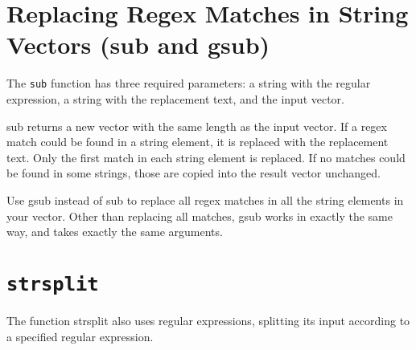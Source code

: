 \documentclass{article}
\begin{document}
\section{Replacing Regex Matches in String Vectors (sub and gsub)}

The \texttt{sub} function has three required parameters: a string with the regular expression, a string with the replacement text, and the input vector. 

sub returns a new vector with the same length as the input vector. If a regex match could be found in a string element, it is replaced with the replacement text. Only the first match in each string element is replaced. If no matches could be found in some strings, those are copied into the result vector unchanged.

Use gsub instead of sub to replace all regex matches in all the string elements in your vector. Other than replacing all matches, gsub works in exactly the same way, and takes exactly the same arguments.
\section{\texttt{strsplit}}
The function strsplit also uses regular expressions, splitting its input according to a specified regular expression.
\end{document}
